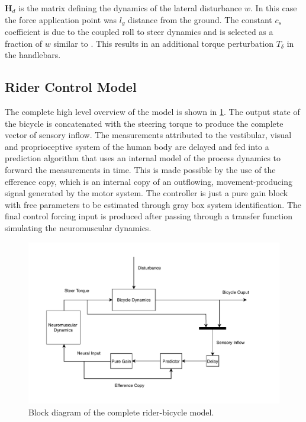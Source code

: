 \ensuremath{\mathbf{H}_d} is the matrix defining the dynamics of the lateral disturbance \ensuremath{w}. In this case the force application point was \ensuremath{l_g} distance from the ground. The constant \ensuremath{c_s} coefficient is due to the coupled roll to steer dynamics and is selected as a fraction of \ensuremath{w} similar to \citet{schwab2013}. This results in an additional  torque perturbation \ensuremath{T_\delta } in the handlebars.

\subsection{Rider Control Model}\label{subsec:rider_model}

 The complete high level overview of the model is shown in \cref{fig:paper3}. The output state of the bicycle is concatenated with the steering torque to produce the complete vector of sensory inflow. The measurements attributed to the vestibular, visual and proprioceptive system of the human body are delayed and fed into a prediction algorithm that uses an internal model of the process dynamics to forward the measurements in time. This is made possible by the use of the efference copy, which is an internal copy of an outflowing, movement-producing signal generated by the motor system. The controller  is just a pure gain block with free parameters to be estimated through gray box system identification. The final control forcing input is produced after passing through a transfer function simulating the neuromuscular dynamics.
\begin{figure}[ht]
    \centering
    \captionsetup{justification=centering,margin=2cm}

    \includegraphics[scale=0.8]{images/high_level_block.pdf}
    \caption{Block diagram of the complete rider-bicycle model.} 
    \label{fig:paper3}
\end{figure}

